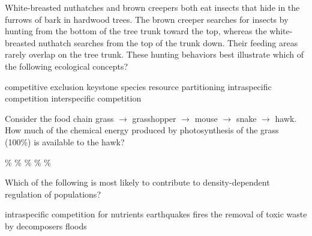\question
White-breasted nuthatches and brown creepers both eat insects that hide in the furrows of bark in hardwood trees. The brown creeper searches for insects by hunting from the bottom of the tree trunk toward the top, whereas the white-breasted nuthatch searches from the top of the trunk down. Their feeding areas rarely overlap on the tree trunk. These hunting behaviors best illustrate which of the following ecological concepts?

\begin{choices}
\choice competitive exclusion
\choice keystone species
\correctchoice resource partitioning
\choice intraspecific competition
\choice interspecific competition
\end{choices}

\question
Consider the food chain grass $\to$ grasshopper $\to$ mouse $\to$ snake $\to$ hawk. How much of the chemical energy produced by photosynthesis of the grass (100\%) is available to the hawk?

\begin{choices}
\%
\%
\%
\%
\%
\end{choices}

\newpage

\question
Which of the following is most likely to contribute to density-dependent regulation of populations?

\begin{choices}
\correctchoice intraspecific competition for nutrients
\choice earthquakes
\choice fires
\choice the removal of toxic waste by decomposers
\choice floods
\end{choices}
